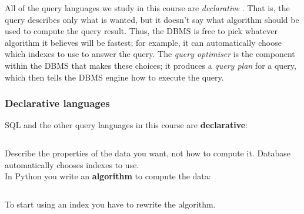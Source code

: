 All of the query languages we study in this course are \emph{declarative} \citep{Krishnaswami2013}.
That is, the query describes only what is wanted, but it doesn't say what algorithm should be used to compute the query result.
Thus, the DBMS is free to pick whatever algorithm it believes will be fastest; for example, it can automatically choose which indexes to use to answer the query.
The \emph{query optimiser} is the component within the DBMS that makes these choices; it produces a \emph{query plan} for a query, which then tells the DBMS engine how to execute the query.

\begin{frame}
    \label{s:declarative}
    \frametitle{Declarative languages}
    SQL and the other query languages in this course are \textbf{declarative}:
    \inputminted[fontsize=\footnotesize]{sql}{code/declarative-sql.sql}
    \vspace{0.6em}
    Describe the properties of the data you want, not how to compute it.
    Database automatically chooses indexes to use.\\[1em]\pause
    In Python you write an \textbf{algorithm} to compute the data:
    \inputminted[fontsize=\footnotesize]{python}{code/declarative-python.py}
    \vspace{0.6em}
    To start using an index you have to rewrite the algorithm.
\end{frame}
\label{l:declarative}

